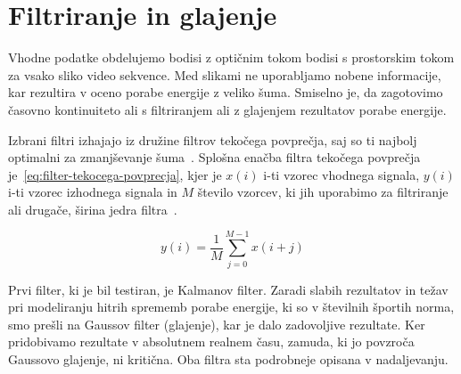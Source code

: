 \section{Filtriranje in glajenje}\label{sec:filtri}
Vhodne podatke obdelujemo bodisi z optičnim tokom bodisi s prostorskim tokom za vsako sliko video sekvence. Med slikami ne uporabljamo nobene informacije, kar rezultira v oceno porabe energije z veliko šuma. Smiselno je, da zagotovimo časovno kontinuiteto ali s filtriranjem ali z glajenjem rezultatov porabe energije.

Izbrani filtri izhajajo iz družine filtrov tekočega povprečja, saj so ti najbolj optimalni za zmanjševanje šuma~\cite{smith1997scientist}. Splošna enačba filtra tekočega povprečja je~\eqref{eq:filter-tekocega-povprecja}, kjer je $x(i)$ i-ti vzorec vhodnega signala, $y(i)$ i-ti vzorec izhodnega signala in $M$ število vzorcev, ki jih uporabimo za filtriranje ali drugače, širina jedra filtra~\cite{smith1997scientist}.

\begin{equation}
y(i) = \frac{1}{M} \sum_{j=0}^{M-1} x(i + j)
\label{eq:filter-tekocega-povprecja}
\end{equation}

Prvi filter, ki je bil testiran, je Kalmanov filter. Zaradi slabih rezultatov in težav pri modeliranju hitrih sprememb porabe energije, ki so v številnih športih norma, smo prešli na Gaussov filter (glajenje), kar je dalo zadovoljive rezultate. Ker pridobivamo rezultate v absolutnem realnem času, zamuda, ki jo povzroča Gaussovo glajenje, ni kritična. Oba filtra sta podrobneje opisana v nadaljevanju.





